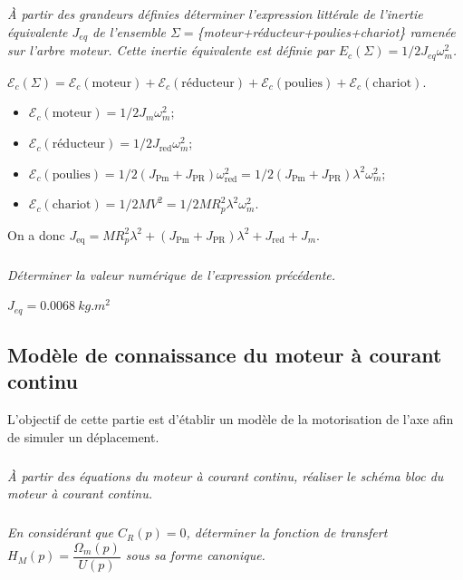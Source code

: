 \documentclass[10pt,fleqn]{article} %
\begin{document}
\begin{multicols}{2}
\subparagraph{}
\textit{À partir des grandeurs définies déterminer l'expression littérale de l'inertie équivalente $J_{eq}$ de l'ensemble $\Sigma=$\{moteur+réducteur+poulies+chariot\} ramenée sur l'arbre moteur. Cette inertie équivalente est définie par $E_c (\Sigma)=1/2 J_{eq} \omega_m^2$.}
\ifprof
\begin{corrige}
$\mathcal{E}_c(\Sigma)=\mathcal{E}_c (\text{moteur})+\mathcal{E}_c (\text{réducteur})+\mathcal{E}_c (\text{poulies})+\mathcal{E}_c (\text{chariot})$.
\begin{itemize}
	\item $\mathcal{E}_c (\text{moteur})=1/2 J_m \omega_m^2$;
	\item $\mathcal{E}_c (\text{réducteur})=1/2 J_{\text{red}} \omega_m^2$;
	\item $\mathcal{E}_c (\text{poulies})=1/2 (J_{\text{Pm}}+J_{\text{PR}}  ) \omega_{\text{red}}^2=1/2 (J_{\text{Pm}}+J_{\text{PR}}  ) \lambda^2 \omega_m^2$;
	\item $\mathcal{E}_c (\text{chariot})=1/2 MV^2=1/2 MR_p^2 \lambda^2 \omega_m^2$.
\end{itemize}
On a donc $J_{\text{eq}}=MR_p^2 \lambda^2+(J_{\text{Pm}}+J_{\text{PR}}  ) \lambda^2+J_{\text{red}}+J_m$.

\end{corrige}
\else
\fi

\subparagraph{}
\textit{Déterminer la valeur numérique de l'expression précédente.}
\ifprof
\begin{corrige}
$J_{eq}=\SI{0,0068}{kg.m^2}$
\end{corrige}
\else
\fi

\subsection*{Modèle de connaissance du moteur à courant continu}

\begin{obj}
L'objectif de cette partie est d'établir un modèle de la motorisation de l'axe afin de simuler un déplacement.
\end{obj}

\subparagraph{}
\textit{À partir des équations du moteur à courant continu, réaliser le schéma bloc du moteur à courant continu.}
\ifprof
\begin{corrige}
\end{corrige}
\else
\fi

\subparagraph{}
\textit{En considérant que $C_R (p)=0$, déterminer la fonction de transfert $H_M (p)=\dfrac{\Omega_m (p)}{U(p)}$ sous sa forme canonique.}
\ifprof
\begin{corrige}
\end{corrige}
\else
\fi


\end{multicols}
\end{document}
